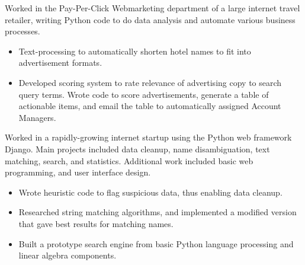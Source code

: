 \documentclass[11pt,a4paper,sans]{moderncv} %
\begin{document}
{Worked in the Pay-Per-Click Webmarketing department of a large internet travel retailer, writing Python code to do data analysis and automate various business processes.
	\begin{itemize}
		\item Text-processing to automatically shorten hotel names to fit into advertisement formats.
		\item Developed scoring system to rate relevance of advertising copy to search query terms.  Wrote code to score advertisements, generate a table of actionable items, and email the table to automatically assigned Account Managers.
	\end{itemize}
}
\vspace{0.2em}

{Worked in a rapidly-growing internet startup using the Python web framework Django.  Main projects included data cleanup, name disambiguation, text matching, search, and statistics.  Additional work included basic web programming, and user interface design.  
\begin{itemize}
	\item Wrote heuristic code to flag suspicious data, thus enabling data cleanup.
	\item Researched string matching algorithms, and implemented a modified version that gave best results for matching names.
	\item Built a prototype search engine from basic Python language processing and linear algebra components.
\end{itemize}
}
\end{document}

